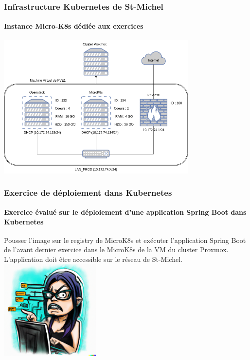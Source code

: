 \documentclass{beamer}
\begin{document}
    \begin{frame}
        \transdissolve
        \frametitle{Infrastructure Kubernetes de St-Michel}
        \framesubtitle{Instance Micro-K8s dédiée aux exercices}
        \bigbreak
        \centering
        \includegraphics[width=10cm]{image/infra.drawio}
    \end{frame}

    \begin{frame}
        \transdissolve
        \frametitle{Exercice \execcounterdispinc{} de déploiement dans Kubernetes}
        \framesubtitle{Exercice évalué sur le déploiement d'une application Spring Boot dans Kubernetes}
        Pousser l'image sur le registry de MicroK8s et exécuter l'application Spring Boot  de l'avant dernier exercice dans le MicroK8s de la VM du cluster Proxmox.
        \bigbreak
        L'application doit être accessible sur le réseau de St-Michel.
        \bigbreak
        \centering
        \includegraphics[width=5cm]{image/maniac-programmer-sorting-her-code}
    \end{frame}
\end{document}
